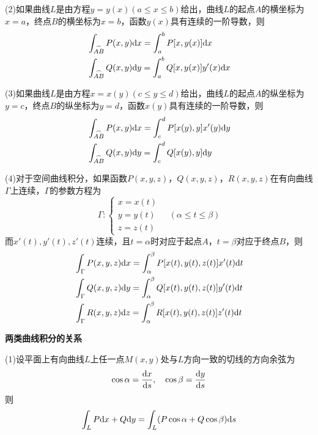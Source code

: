 (2)如果曲线$L$是由方程$y=y(x)(a\leq x\leq b)$给出，曲线$L$的起点$A$的横坐标为$x=a$，终点$B$的横坐标为$x=b$，函数$y(x)$具有连续的一阶导数，则
\begin{align*}
    & \int_{\overset{\Large\frown}{AB}}P(x,y)\mathrm{d} x=\int_{a}^{b} P[x,y(x)]\mathrm{d} x \\
    & \int_{\overset{\Large\frown}{AB}}Q(x,y)\mathrm{d} y=\int_{a}^{b} Q[x,y(x)]y'(x)\mathrm{d} x
\end{align*}

(3)如果曲线$L$是由方程$x=x(y)(c\leq y\leq d)$给出，曲线$L$的起点$A$的纵坐标为$y=c$，终点$B$的纵坐标为$y=d$，函数$x(y)$具有连续的一阶导数，则
\begin{align*}
    & \int_{\overset{\Large\frown}{AB}}P(x,y)\mathrm{d} x=\int_{c}^{d} P[x(y),y]x'(y)\mathrm{d} y \\
    & \int_{\overset{\Large\frown}{AB}}Q(x,y)\mathrm{d} y=\int_{c}^{d} Q[x(y),y]\mathrm{d} y
\end{align*}

(4)对于空间曲线积分，如果函数$P(x,y,z)$，$Q(x,y,z)$，$R(x,y,z)$在有向曲线$\Gamma$上连续，$\Gamma$的参数方程为
\begin{equation*}
    \Gamma:
    \begin{cases}
        x=x(t) \\
        y=y(t) \\
        z=z(t)
    \end{cases}
    \quad (\alpha\leq t\leq \beta)
\end{equation*}
而$x'(t),y'(t),z'(t)$连续，且$t=\alpha$时对应于起点$A$，$t=\beta$对应于终点$B$，则
\begin{align*}
    & \int_{\Gamma}P(x,y,z)\mathrm{d} x=\int_{\alpha}^{\beta} P[x(t),y(t),z(t)]x'(t)\mathrm{d} t \\
    & \int_{\Gamma}Q(x,y,z)\mathrm{d} y=\int_{\alpha}^{\beta} Q[x(t),y(t),z(t)]y'(t)\mathrm{d} t \\
    & \int_{\Gamma}R(x,y,z)\mathrm{d} z=\int_{\alpha}^{\beta} R[x(t),y(t),z(t)]z'(t)\mathrm{d} t
\end{align*}

\textbf{两类曲线积分的关系}

(1)设平面上有向曲线$L$上任一点$M(x,y)$处与$L$方向一致的切线的方向余弦为
\begin{equation*}
    \cos\alpha=\frac{\mathrm{d} x}{\mathrm{d} s},\quad \cos\beta=\frac{\mathrm{d} y}{\mathrm{d} s}
\end{equation*}
则
\begin{equation*}
    \int_{L}P\mathrm{d} x+Q\mathrm{d} y=\int_{L}(P\cos\alpha+Q\cos\beta)\mathrm{d} s
\end{equation*}

